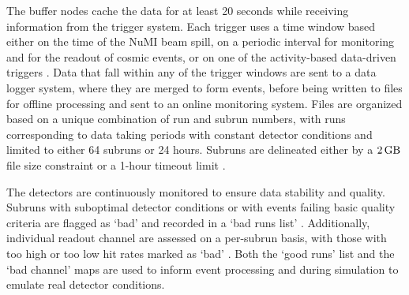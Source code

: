 The buffer nodes cache the data for at least 20 seconds while receiving information from the trigger system. Each trigger uses a time window based either on the time of the \gls{NuMI} beam spill, on a periodic interval for monitoring and for the readout of cosmic events, or on one of the activity-based data-driven triggers \cite{NOvADAQ.pdf}. Data that fall within any of the trigger windows are sent to a data logger system, where they are merged to form events, before being written to files for offline processing and sent to an online monitoring system. Files are organized based on a unique combination of run and subrun numbers, with runs corresponding to data taking periods with constant detector conditions and limited to either 64 subruns or 24 hours. Subruns are delineated either by a $\unit[2]{GB}$ file size constraint or a 1-hour timeout limit \cite{NOvA-doc-13546}.

The detectors are continuously monitored to ensure data stability and quality. Subruns with suboptimal detector conditions or with events failing basic quality criteria are flagged as `bad' and recorded in a `bad runs list' \cite{NOvA-doc-13546}. Additionally, individual readout channel are assessed on a per-subrun basis, with those with too high or too low hit rates marked as `bad' \cite{NOvA-doc-12771}. Both the `good runs' list and the `bad channel' maps are used to inform event processing and during simulation to emulate real detector conditions.




